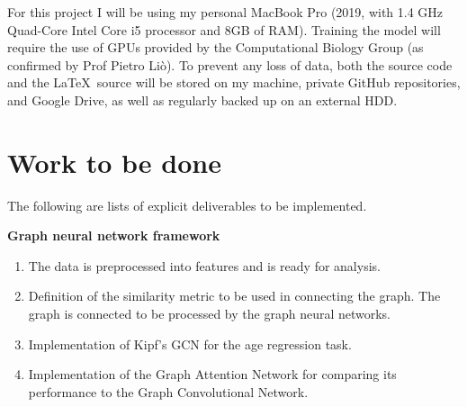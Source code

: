 \documentclass[12pt,a4paper,twoside]{article}
\begin{document}
For this project I will be using my personal MacBook Pro (2019, with 1.4 GHz Quad-Core Intel Core i5 processor and 8GB of RAM). Training the model will require the use of GPUs provided by the Computational Biology Group (as confirmed by Prof Pietro Liò). To prevent any loss of data, both the source code and the \LaTeX\ source will be stored on my machine, private GitHub repositories, and Google Drive, as well as regularly backed up on an external HDD.

\section*{Work to be done}
\label{section:work}


The following are lists of explicit deliverables to be implemented.

\textbf{Graph neural network framework}
\begin{enumerate}[label=G\arabic*.]
  \item The data is preprocessed into features and is ready for analysis. %
  \item Definition of the similarity metric to be used in connecting the graph. The graph is connected to be processed by the graph neural networks.
  \item Implementation of Kipf's GCN \cite{kipf2017semi} for the age regression task.
  \item Implementation of the Graph Attention Network for comparing its performance to the Graph Convolutional Network.
\end{enumerate}
\end{document}
